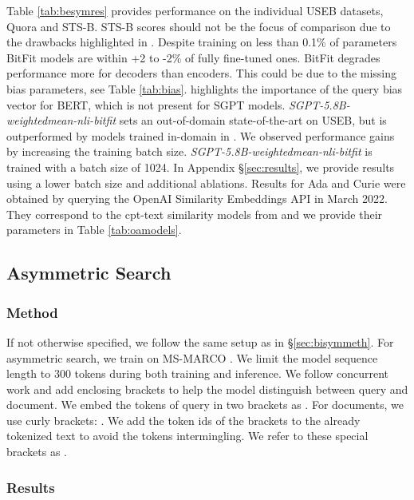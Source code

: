 \documentclass{article}
\begin{document}
Table \ref{tab:besymres} provides performance on the individual USEB datasets, Quora and STS-B. STS-B scores should not be the focus of comparison due to the drawbacks highlighted in \cite{wang2021tsdae}. Despite training on less than 0.1\% of parameters BitFit models are within +2 to -2\% of fully fine-tuned ones. BitFit degrades performance more for decoders than encoders. This could be due to the missing bias parameters, see Table \ref{tab:bias}. \cite{zaken2021bitfit} highlights the importance of the query bias vector for BERT, which is not present for SGPT models. \textit{SGPT-5.8B-weightedmean-nli-bitfit} sets an out-of-domain state-of-the-art on USEB, but is outperformed by models trained in-domain in \cite{wang2021tsdae}. We observed performance gains by increasing the training batch size. \textit{SGPT-5.8B-weightedmean-nli-bitfit} is trained with a batch size of 1024. In Appendix \S\ref{sec:results}, we provide results using a lower batch size and additional ablations. Results for Ada and Curie were obtained by querying the OpenAI Similarity Embeddings API in March 2022. They correspond to the cpt-text similarity models from \cite{neelakantan2022text} and we provide their parameters in Table \ref{tab:oamodels}.

\subsection{Asymmetric Search}\label{sec:biasym}

\subsubsection{Method}\label{sec:biasymmeth}

If not otherwise specified, we follow the same setup as in \S\ref{sec:bisymmeth}. For asymmetric search, we train on MS-MARCO \cite{nguyen2016ms}. We limit the model sequence length to 300 tokens during both training and inference. We follow concurrent work \cite{neelakantan2022text} and add enclosing brackets to help the model distinguish between query and document. We embed the tokens of query  in two brackets as . For documents, we use curly brackets: . We add the token ids of the brackets to the already tokenized text to avoid the tokens intermingling. We refer to these special brackets as .

\subsubsection{Results}\label{sec:biasymres}
\end{document}

